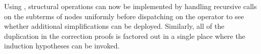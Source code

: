 
Using , structural operations can now be implemented by handling recursive calls on the subterms of  nodes uniformly before dispatching on the operator to see whether additional simplifications can be deployed.
%
Similarly, all of the duplication in the correction proofs is factored out in a single place where the induction hypotheses can be invoked.



